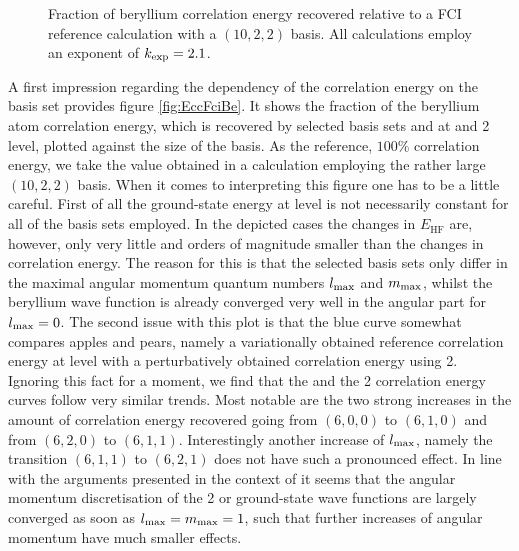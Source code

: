 \begin{figure}
	\centering
	\caption[
		Fraction of beryllium correlation energy
		recovered with selected \CS bases
	]{
		Fraction of beryllium correlation energy recovered
		relative to a FCI reference calculation with a $(10, 2, 2)$ \CS basis.
		All calculations employ an exponent of $k_\text{exp} = 2.1$.
	}
	\label{fig:EccFciBe}
\end{figure}
A first impression regarding the dependency of the correlation energy
on the \CS basis set provides figure \vref{fig:EccFciBe}.
It shows the fraction of the beryllium atom correlation energy, which is recovered
by selected \CS basis sets and at \FCI and {\MP}2 level,
plotted against the size of the basis.
As the reference, \ie $100\%$ correlation energy,
we take the value obtained in a \FCI calculation employing
the rather large $(10,2,2)$ \CS basis.
When it comes to interpreting this figure one has to be a little careful.
First of all the ground-state energy at \HF level is
not necessarily constant for all of the basis sets employed.
In the depicted cases the changes in $E_\text{HF}$ are,
however, only very little and orders of magnitude
smaller than the changes in correlation energy.
The reason for this is that the selected basis sets only differ
in the maximal angular momentum quantum numbers $l_\text{max}$ and $m_\text{max}$,
whilst the beryllium \HF wave function is already
converged very well in the angular part for $l_\text{max} = 0$.
The second issue with this plot
is that the blue curve somewhat compares apples and pears,
namely a variationally obtained reference correlation energy at \FCI level
with a perturbatively obtained correlation energy using {\MP}2.
Ignoring this fact for a moment,
we find that the \FCI and the {\MP}2 correlation energy curves
follow very similar trends.
Most notable are the two strong increases in the amount of correlation
energy recovered going from $(6,0,0)$ to $(6,1,0)$
and from $(6,2,0)$ to $(6,1,1)$.
Interestingly another increase of $l_\text{max}$,
namely the transition $(6,1,1)$ to $(6,2,1)$
does not have such a pronounced effect.
In line with the arguments presented in the context of \HF
it seems that the angular momentum discretisation
of the {\MP}2 or \FCI ground-state wave functions
are largely converged as soon as $l_\text{max} = m_\text{max} = 1$,
such that further increases of angular momentum have much smaller effects.

